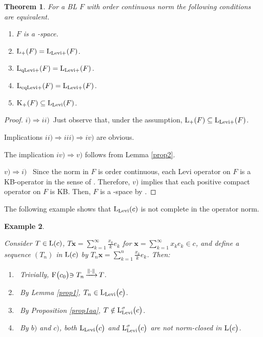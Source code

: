 \documentclass[10pt]{article}
\makeatletter
\newtheorem{theorem}{Theorem}[section]
\newtheorem{example}[theorem]{Example}
\DeclareMathOperator{\convn}{\xrightarrow[]{\|\cdot\|}}
\renewcommand{\subsection}{\@startsection{subsection}{1}
{0pt}{3.25ex plus 1ex minus.2ex}{-1em}{\normalfont\normalsize\bf}}
\makeatother
\begin{document}
{{{\begin{theorem}\label{prop8}%
For a BL $F$ with order continuous norm the following conditions are equivalent. 
\begin{enumerate}[$i)$]
\item 
$F$ is a -space.
\item  
$\text{\rm L}_+(F)=\text{\rm L}_{\text{\rm Levi+}}(F)$.
\item 
$\text{\rm L}_{\text{\rm qLevi+}}(F)=\text{\rm L}_{\text{\rm Levi+}}(F)$.
\item 
$\text{\rm L}_{\text{\rm cqLevi+}}(F)=\text{\rm L}_{\text{\rm Levi+}}(F)$.
\item 
$\text{\rm K}_+(F)\subseteq\text{\rm L}_{\text{\rm Levi}}(F)$.
\end{enumerate}
\end{theorem}

\begin{proof}
$i) \Longrightarrow ii)$\ 
Just observe that, under the assumption, 
$\text{\rm L}_+(F)\subseteq\text{\rm L}_{\text{\rm Levi+}}(F)$.

\medskip
Implications $ii)\Longrightarrow iii)\Longrightarrow iv)$ are obvious.

\medskip
The implication $iv) \Longrightarrow v)$ follows from Lemma \ref{prop2}.

\medskip
$v) \Longrightarrow i)$ \ 
Since the norm in $F$ is order continuous, each Levi operator on $F$ is a KB-operator in the sense of \cite{AlEG2022,GE2022,E2025-1}.
Therefore, $v)$ implies that each positive compact operator on $F$ is KB. Then, $F$ is a -space by \cite[Theorem 2]{E2025-1}.
\end{proof}

\medskip
The following example shows that 
$\text{\rm L}_{\text{\rm Levi}}(c)$ is not complete in the operator norm.

\begin{example}\label{KB-not-compl}%
{\em
Consider $T\in\text{\rm L}(c)$, $T\mathbf{x}=\sum_{k=1}^\infty \frac{x_k}{k} e_k$ for 
$\mathbf{x}=\sum_{k=1}^\infty x_k e_k\in c$,
and define a sequence $(T_n)$ in $\text{\rm L}(c)$ by
$T_n\mathbf{x}=\sum_{k=1}^n\frac{x_k}{k} e_k$. Then:
\begin{enumerate}[$a)$]
\item\
Trivially,
$\text{\rm F}\bigl(c_0\bigl)\ni T_n\convn T$.
\item\
By Lemma \ref{prop1}, 
$T_n\in{\rm L}_{\text{\rm Levi}}\bigl(c\bigl)$.
\item\
By Proposition \ref{prop1aa}, 
$T\notin\text{\rm L}^\sigma_{\text{\rm Levi}}\bigl(c\bigl)$.
\item\
By $b)$ and $c)$, both
${\rm L}_{\text{\rm Levi}}\bigl(c\bigl)$ and 
$\text{\rm L}^\sigma_{\text{\rm Levi}}\bigl(c\bigl)$
are not norm-closed in ${\rm L}\bigl(c\bigl)$.
\end{enumerate}
}
\end{example}

}}}
\end{document}
